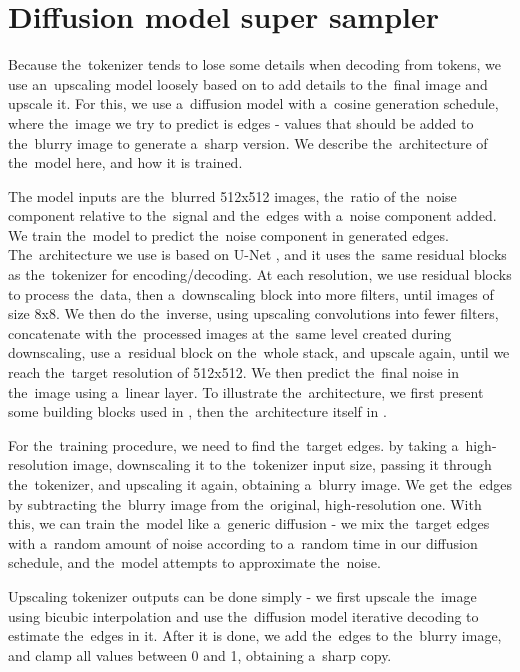 \section{Diffusion model super sampler}

Because the~tokenizer tends to lose some details when decoding from tokens, we use an~upscaling model loosely based on \citep{diffusion_super_sampler} to add details to the~final image and upscale it. For this, we use a~diffusion model with a~cosine generation schedule, where the~image we try to predict is edges - values that should be added to the~blurry image to generate a~sharp version. We describe the~architecture of the~model here, and how it is trained.

The model inputs are the~blurred 512x512 images, the~ratio of the~noise component relative to the~signal and the~edges with a~noise component added. We train the~model to predict the~noise component in generated edges. The~architecture we use is based on U-Net \citep{u_net}, and it uses the~same residual blocks as the~tokenizer for encoding/decoding. At each resolution, we use residual blocks to process the~data, then a~downscaling block into more filters, until images of size 8x8. We then do the~inverse, using upscaling convolutions into fewer filters, concatenate with the~processed images at the~same level created during downscaling, use a~residual block on the~whole stack, and upscale again, until we reach the~target resolution of 512x512. We then predict the~final noise in the~image using a~linear layer. To illustrate the~architecture, we first present some building blocks used in , then the~architecture itself in .




For the~training procedure, we need to find the~target edges. by taking a~high-resolution image, downscaling it to the~tokenizer input size, passing it through the~tokenizer, and upscaling it again, obtaining a~blurry image. We get the~edges by subtracting the~blurry image from the~original, high-resolution one. With this, we can train the~model like a~generic diffusion - we mix the~target edges with a~random amount of noise according to a~random time in our diffusion schedule, and the~model attempts to approximate the~noise.

Upscaling tokenizer outputs can be done simply - we first upscale the~image using bicubic interpolation and use the~diffusion model iterative decoding to estimate the~edges in it. After it is done, we add the~edges to the~blurry image, and clamp all values between 0 and 1, obtaining a~sharp copy.
